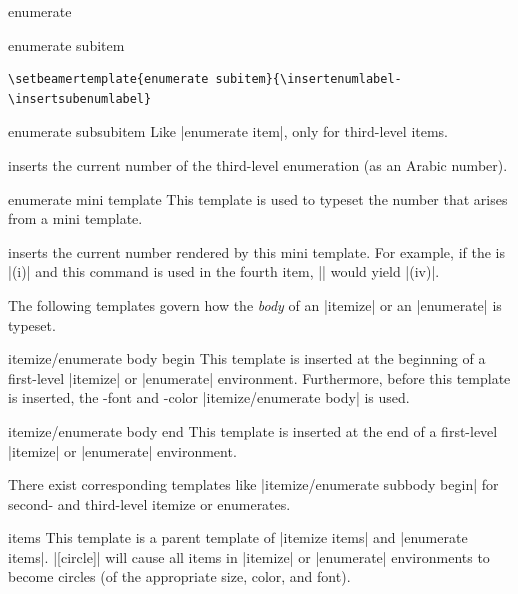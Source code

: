 \begin{environment}{{enumerate}}
\begin{element}{enumerate subitem}
    \example
\begin{verbatim}
\setbeamertemplate{enumerate subitem}{\insertenumlabel-\insertsubenumlabel}
\end{verbatim}
  \end{element}

  \begin{element}{enumerate subsubitem}\yes\yes\yes
    Like |enumerate item|, only for third-level items.

    \begin{templateinserts}
      \iteminsert{\insertsubsubenumlabel}
      inserts the current number of the third-level enumeration (as an Arabic number).
    \end{templateinserts}
  \end{element}

  \begin{element}{enumerate mini template}\yes\yes\yes
    This template is used to typeset the number that arises from a mini template.

    \begin{templateinserts}
      \iteminsert{\insertenumlabel}
      inserts the current number rendered by this mini template. For example, if the  is |(i)| and this command is used in the fourth item, |\insertenumlabel| would yield |(iv)|.
    \end{templateinserts}
  \end{element}
\end{environment}

The following templates govern how the \emph{body} of an |itemize| or an |enumerate| is typeset.
\begin{element}{itemize/enumerate body begin}\yes\no\no
  This template is inserted at the beginning of a first-level |itemize| or |enumerate| environment. Furthermore, before this template is inserted, the \beamer-font and -color |itemize/enumerate body| is used.
\end{element}
\begin{element}{itemize/enumerate body end}\yes\no\no
  This template is inserted at the end of a first-level |itemize| or |enumerate| environment.
\end{element}
There exist corresponding templates like |itemize/enumerate subbody begin| for second- and third-level itemize or enumerates.

\begin{element}{items}\semiyes\no\no
  This template is a parent template of |itemize items| and |enumerate items|.
  \example
  |[circle]| will cause all items in |itemize| or |enumerate| environments to become circles (of the appropriate size, color, and font).
\end{element}

